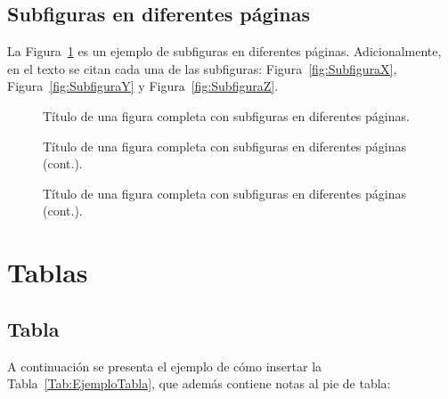 \subsection{Subfiguras en diferentes páginas}

La Figura~\ref{fig:SubfigurasMultiplesPaginas} es un ejemplo de subfiguras en diferentes páginas. Adicionalmente, en el texto se citan cada una de las subfiguras: Figura~\ref{fig:SubfiguraX}, Figura~\ref{fig:SubfiguraY} y Figura~\ref{fig:SubfiguraZ}.


\newpage
\begin{figure}[thbp]
	\centering
	\caption[Título de una figura completa con subfiguras en diferentes páginas.]{Título de una figura completa con subfiguras en diferentes páginas.}
\label{fig:SubfigurasMultiplesPaginas} %
\end{figure}


\newpage
\begin{figure}[thbp]
\ContinuedFloat
	\centering
	\caption[]{Título de una figura completa con subfiguras en diferentes páginas (cont.).} %
\end{figure}


\newpage
\begin{figure}[thbp]
\ContinuedFloat
	\centering
	\caption[]{Título de una figura completa con subfiguras en diferentes páginas (cont.).} %
\end{figure}



\newpage
\section{Tablas}
\subsection{Tabla}
A continuación se presenta el ejemplo de cómo insertar la Tabla~\ref{Tab:EjemploTabla}, que además contiene notas al pie de tabla:



